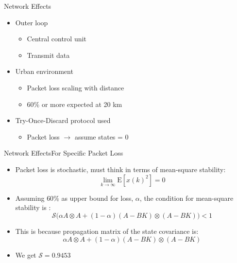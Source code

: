 \begin{frame}{Network Effects}
	\begin{itemize}
		\item Outer loop
		\begin{itemize}
			\item Central control unit
			\item Transmit data
		\end{itemize}
		\item Urban environment
		\begin{itemize}
			\item Packet loss scaling with distance
			\item $ 60\% $ or more expected at 20 km
		\end{itemize}
		\item Try-Once-Discard protocol used
		\begin{itemize}
			\item Packet loss $\rightarrow$ assume states = 0
		\end{itemize}
	\end{itemize}
	\begin{figure}[h!]
	\centering
	\resizebox{0.9\columnwidth}{!}{
		}
	\label{fig:tikzControlStructure}
\end{figure}
\end{frame}

\begin{frame}{Network Effects}{For Specific Packet Loss}
	\begin{itemize}
	\item Packet loss is stochastic, must think in terms of mean-square stability: 
	\begin{equation}
		\lim_{k \rightarrow \infty} \text{E}[x(k)^2] = 0
	\end{equation}
	\item Assuming $ 60\% $ as upper bound for loss, $ \alpha $, the condition for mean-square stability is \cite{Hu2007}:
	\begin{equation}\label{eq:HuStabCondition}
		\mathcal{S}\Big(\alpha A \otimes A + (1-\alpha)(A-BK) \otimes (A-BK) \Big) < 1
	\end{equation}
		\item This is because propagation matrix of the state covariance is:
	\begin{equation}\label{eq:HuStabCondition}
		\alpha A \otimes A + (1-\alpha)(A-BK) \otimes (A-BK) 
	\end{equation}
		\item We get $\mathcal{S} = 0.9453 $
	\end{itemize}
\end{frame}	
	
